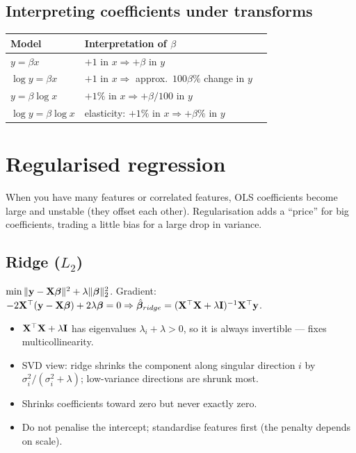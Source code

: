 \subsection{Interpreting coefficients under transforms}
\begin{tabular}{@{}lll@{}}
\toprule
Model & Interpretation of $\beta$\\
\midrule
$y=\beta x$ & $+1$ in $x\Rightarrow+\beta$ in $y$\\
$\log y=\beta x$ & $+1$ in $x\Rightarrow$ approx.\ $100\beta\%$ change in $y$\\
$y=\beta\log x$ & $+1\%$ in $x\Rightarrow+\beta/100$ in $y$\\
$\log y=\beta\log x$ & elasticity: $+1\%$ in $x\Rightarrow+\beta\%$ in $y$\\
\bottomrule
\end{tabular}

\section{Regularised regression}

\begin{intuition}
When you have many features or correlated features, OLS coefficients become large and unstable (they offset each other). Regularisation adds a ``price'' for big coefficients, trading a little bias for a large drop in variance.
\end{intuition}

\subsection{Ridge (\texorpdfstring{$L_2$}{L2})}
$\min\|\mathbf{y}-\mathbf{X}\bm{\beta}\|^2+\lambda\|\bm{\beta}\|_2^2$. Gradient: $-2\mathbf{X}^\top(\mathbf{y}-\mathbf{X}\bm{\beta})+2\lambda\bm{\beta}=0\Rightarrow\hat{\bm{\beta}}_{ridge}=(\mathbf{X}^\top\mathbf{X}+\lambda\mathbf{I})^{-1}\mathbf{X}^\top\mathbf{y}$.
\begin{itemize}
  \item $\mathbf{X}^\top\mathbf{X}+\lambda\mathbf{I}$ has eigenvalues $\lambda_i+\lambda>0$, so it is always invertible --- fixes multicollinearity.
  \item SVD view: ridge shrinks the component along singular direction $i$ by $\sigma_i^2/(\sigma_i^2+\lambda)$; low-variance directions are shrunk most.
  \item Shrinks coefficients toward zero but never exactly zero.
  \item Do not penalise the intercept; standardise features first (the penalty depends on scale).
\end{itemize}

